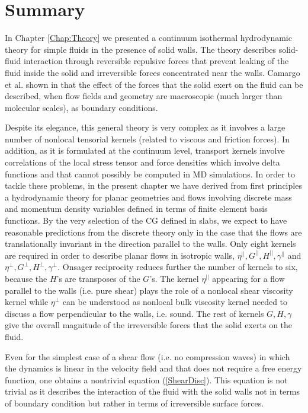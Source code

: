 \documentclass[b5paper,openright,10pt]{book}
\begin{document}
\section{Summary}
In Chapter \ref{Chap:Theory} we presented  a continuum isothermal
hydrodynamic  theory  for  simple  fluids in  the  presence  of  solid
walls. The theory describes solid-fluid interaction through reversible
repulsive forces  that prevent leaking  of the fluid inside  the solid
and irreversible forces concentrated near  the walls. Camargo et al. shown in
\cite{CamargoBC2018} that  the effect of  the forces that  the solid exert  on the
fluid can be described, when  flow fields and geometry are macroscopic
(much larger than molecular scales), as boundary conditions.

Despite  its elegance,  this  general  theory is  very  complex as  it
involves a  large number  of nonlocal  tensorial kernels  (related to
viscous and friction forces).  In addition, as it is formulated at the
continuum level,  transport kernels involve correlations  of the local
stress tensor and force densities  which involve delta functions
and that cannot  possibly be computed in MD simulations.   In order to
tackle these problems,  in the present chapter we  have derived from
first principles a hydrodynamic theory for planar geometries and flows
involving  discrete mass  and  momentum density  variables defined  in
terms of finite element basis functions.  By the very selection of the
CG defined in slabs, we expect to have reasonable predictions from the
discrete theory  only in the  case that the flows  are translationally
invariant in the direction parallel  to the walls.  Only eight kernels
are required  in order  to describe planar  flows in  isotropic walls,
$\eta^{||},G^{||},H^{||},\gamma^{||}$                              and
$\eta^{\bot},G^{\bot},H^{\bot},\gamma^{\bot}$.    Onsager  reciprocity
reduces further  the number of kernels  to six, because the  $H$'s are
transposes of the $G$'s.  The  kernel $\eta^{||}$ appearing for a flow
parallel to the walls (i.e. pure  shear) plays the role of a nonlocal
shear  viscosity  kernel  while  $\eta^{\bot}$ can  be  understood  as
nonlocal bulk viscosity kernel needed to discuss a flow perpendicular
to the walls,  i.e. sound.  The rest of kernels  $G,H,\gamma$ give the
overall magnitude of the irreversible  forces that the solid exerts on
the fluid.

Even for the simplest case of a shear flow (i.e. no compression waves)
in which  the dynamics is linear  in the velocity field  and that does
not require a free energy function, one obtains a nontrivial equation
(\ref{ShearDisc}). This  equation is not  trivial as it  describes the
interaction of the fluid with the solid walls not in terms of boundary
condition but rather in terms of irreversible surface forces.
\end{document}
